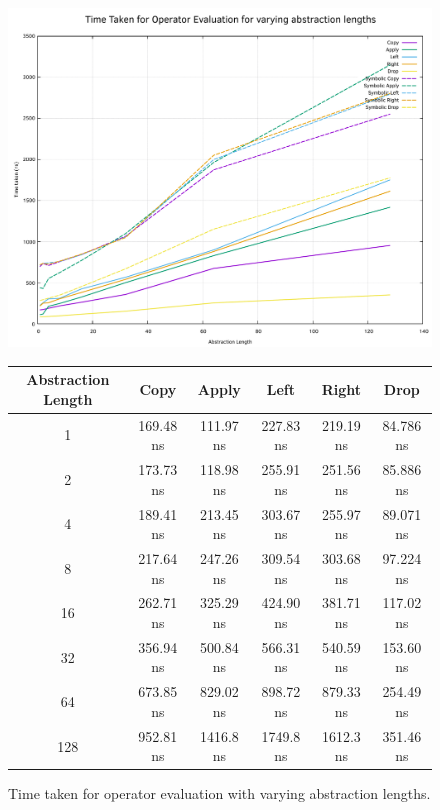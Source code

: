 \begin{figure}[H]
    \centering
    \includegraphics[width=\textwidth - 100pt]{04_results/images/basic_operator_results_2}

    \begin{center}
    \begin{tabular}{ |c|c|c|c|c|c| } 
    \hline
    Abstraction Length & Copy & Apply & Left & Right & Drop \\
    \hline
    1 & 169.48 ns& 111.97 ns & 227.83 ns & 219.19 ns & 84.786 ns \\
    \hline
    2 & 173.73 ns& 118.98 ns & 255.91 ns & 251.56 ns & 85.886 ns \\
    \hline
    4 & 189.41 ns& 213.45 ns & 303.67 ns & 255.97 ns & 89.071 ns \\
    \hline
    8 & 217.64 ns& 247.26 ns & 309.54 ns & 303.68 ns & 97.224 ns \\
    \hline
    16 & 262.71 ns& 325.29 ns & 424.90 ns & 381.71 ns & 117.02 ns \\
    \hline
    32 & 356.94 ns& 500.84 ns & 566.31 ns & 540.59 ns & 153.60 ns \\
    \hline
    64 & 673.85 ns& 829.02 ns & 898.72 ns & 879.33 ns & 254.49 ns \\
    \hline
    128 & 952.81 ns& 1416.8 ns & 1749.8 ns & 1612.3 ns & 351.46 ns \\
    \hline
    \end{tabular}
    \end{center}
    \caption{Time taken for operator evaluation with varying abstraction lengths.}


\end{figure}

